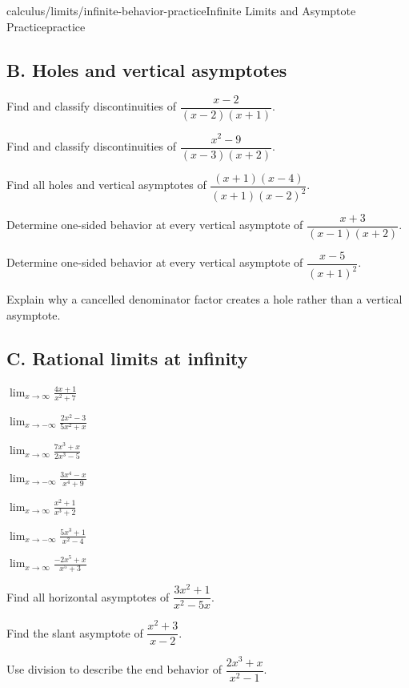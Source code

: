 \begin{webpage}{calculus/limits/infinite-behavior-practice}{Infinite Limits and Asymptote Practice}{practice}
\subsection*{B. Holes and vertical asymptotes}
\begin{bgexercises}[label=\textbf{4.\arabic*},resume]
  \item Find and classify discontinuities of \(\dfrac{x-2}{(x-2)(x+1)}\).
  \item Find and classify discontinuities of \(\dfrac{x^2-9}{(x-3)(x+2)}\).
  \item Find all holes and vertical asymptotes of \(\dfrac{(x+1)(x-4)}{(x+1)(x-2)^2}\).
  \item Determine one-sided behavior at every vertical asymptote of \(\dfrac{x+3}{(x-1)(x+2)}\).
  \item Determine one-sided behavior at every vertical asymptote of \(\dfrac{x-5}{(x+1)^2}\).
  \item Explain why a cancelled denominator factor creates a hole rather than a vertical asymptote.
\end{bgexercises}

\subsection*{C. Rational limits at infinity}
\begin{bgexercises}[label=\textbf{4.\arabic*},resume]
  \item \(\displaystyle\lim_{x\to\infty}\frac{4x+1}{x^2+7}\)
  \item \(\displaystyle\lim_{x\to-\infty}\frac{2x^2-3}{5x^2+x}\)
  \item \(\displaystyle\lim_{x\to\infty}\frac{7x^3+x}{2x^3-5}\)
  \item \(\displaystyle\lim_{x\to-\infty}\frac{3x^4-x}{x^4+9}\)
  \item \(\displaystyle\lim_{x\to\infty}\frac{x^2+1}{x^3+2}\)
  \item \(\displaystyle\lim_{x\to-\infty}\frac{5x^3+1}{x^2-4}\)
  \item \(\displaystyle\lim_{x\to\infty}\frac{-2x^5+x}{x^5+3}\)
  \item Find all horizontal asymptotes of \(\dfrac{3x^2+1}{x^2-5x}\).
  \item Find the slant asymptote of \(\dfrac{x^2+3}{x-2}\).
  \item Use division to describe the end behavior of \(\dfrac{2x^3+x}{x^2-1}\).
\end{bgexercises}


\end{webpage}
